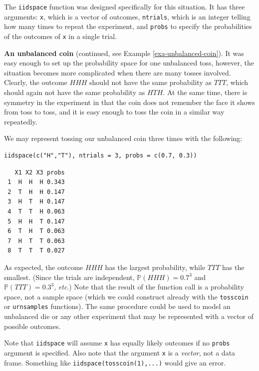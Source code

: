 \documentclass[captions=tableheading]{scrbook}
\begin{document}
The \texttt{iidspace} function was designed specifically for this situation. It has three arguments: \texttt{x}, which is a vector of outcomes, \texttt{ntrials}, which is an integer telling how many times to repeat the experiment, and \texttt{probs} to specify the probabilities of the outcomes of \texttt{x} in a single trial. 

\begin{example}
\textbf{An unbalanced coin} (continued, see Example \ref{exa-unbalanced-coin}). It was easy enough to set up the probability space for one unbalanced toss, however, the situation becomes more complicated when there are many tosses involved. Clearly, the outcome \(HHH\) should not have the same probability as \(TTT\), which should again not have the same probability as \(HTH\). At the same time, there is symmetry in the experiment in that the coin does not remember the face it shows from toss to toss, and it is easy enough to toss the coin in a similar way repeatedly.

We may represent tossing our unbalanced coin three times with the following: 


\lstset{language=R}
\begin{lstlisting}
iidspace(c("H","T"), ntrials = 3, probs = c(0.7, 0.3))
\end{lstlisting}

\begin{verbatim}
   X1 X2 X3 probs
 1  H  H  H 0.343
 2  T  H  H 0.147
 3  H  T  H 0.147
 4  T  T  H 0.063
 5  H  H  T 0.147
 6  T  H  T 0.063
 7  H  T  T 0.063
 8  T  T  T 0.027
\end{verbatim}

As expected, the outcome \(HHH\) has the largest probability, while \(TTT\) has the smallest. (Since the trials are independent, \(\mathbb{P}(HHH)=0.7^{3}\) and \(\mathbb{P}(TTT)=0.3^{3}\), \emph{etc}.) Note that the result of the function call is a probability space, not a sample space (which we could construct already with the \texttt{tosscoin} or \texttt{urnsamples} functions). The same procedure could be used to model an unbalanced die or any other experiment that may be represented with a vector of possible outcomes.

\end{example}

Note that \texttt{iidspace} will assume \texttt{x} has equally likely outcomes if no \texttt{probs} argument is specified. Also note that the argument \texttt{x} is a \emph{vector}, not a data frame. Something like \texttt{iidspace(tosscoin(1),...)} would give an error.
\end{document}
